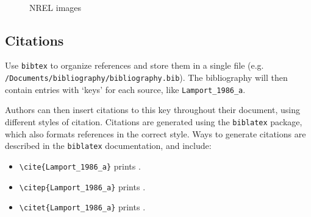 \begin{figure}[htp]
\centering
\hfill
{}
~ 
\hfill
{}
\hfill
\caption{NREL images}\label{fig:NRELimages}
\end{figure}

\subsection{Citations}
\label{Sec:Bib}
Use \texttt{bibtex} to organize references and store them in a single file (e.g. \verb+/Documents/bibliography/bibliography.bib+). The bibliography will then contain entries with `keys' for each source, like \texttt{Lamport\_1986\_a}. 

Authors can then insert citations to this key throughout their document, using different styles of citation. Citations are generated using the \texttt{biblatex} package, which also formats references in the correct style.  Ways to generate citations are described in the \texttt{biblatex} documentation, and include:
\begin{itemize}
\item \verb+\cite{Lamport_1986_a}+ prints \cite{Lamport_1986_a}.
\item \verb+\citep{Lamport_1986_a}+ prints \citep{Lamport_1986_a}.
\item \verb+\citet{Lamport_1986_a}+ prints \citet{Lamport_1986_a}.
\end{itemize}

